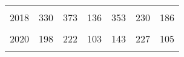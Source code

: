 \documentclass[
]{article}
\begin{document}
\begin{table}
\begin{tabular}[t]{rrrrrrr}
\addlinespace
\cellcolor{gray!6}{2017} & \cellcolor{gray!6}{383} & \cellcolor{gray!6}{507} & \cellcolor{gray!6}{157} & \cellcolor{gray!6}{92} & \cellcolor{gray!6}{137} & \cellcolor{gray!6}{127}\\
2018 & 330 & 373 & 136 & 353 & 230 & 186\\
\cellcolor{gray!6}{2019} & \cellcolor{gray!6}{365} & \cellcolor{gray!6}{340} & \cellcolor{gray!6}{132} & \cellcolor{gray!6}{403} & \cellcolor{gray!6}{222} & \cellcolor{gray!6}{240}\\
2020 & 198 & 222 & 103 & 143 & 227 & 105\\
\cellcolor{gray!6}{2021} & \cellcolor{gray!6}{305} & \cellcolor{gray!6}{246} & \cellcolor{gray!6}{127} & \cellcolor{gray!6}{219} & \cellcolor{gray!6}{271} & \cellcolor{gray!6}{109}\\
\bottomrule
\end{tabular}
\end{table}
\end{document}
